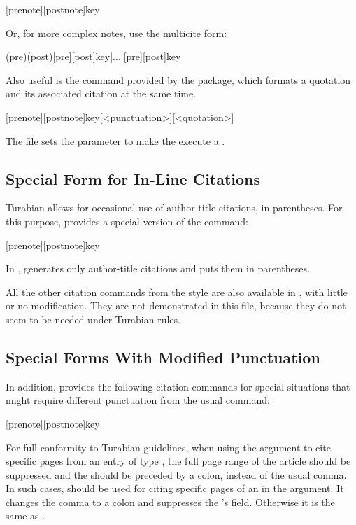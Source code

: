 \documentclass{ltxdockit}[2010/02/12]
\begin{document}
\begin{ltxsyntax}

[prenote][postnote]{key}

Or, for more complex notes, use the multicite form: 

(pre)(post)[pre][post]{key}|...|[pre][post]{key}


Also useful is the   command provided by the  package, which formats a quotation and its associated citation at the same time. 

[prenote][postnote]{key}[<punctuation>][<quotation>]

The  file sets the  parameter to make the  execute a .

\subsection{Special Form for In-Line Citations}

Turabian allows for occasional use of author-title citations, in parentheses. For this purpose,  provides a special version of the  command:

[prenote][postnote]{key}

In ,  generates only author-title citations and puts them in parentheses.

All the other citation commands from the  style are also available in , with little or no modification. They are not demonstrated in this file, because they do not seem to be needed under Turabian rules.

\subsection{Special Forms With Modified Punctuation}

In addition,  provides the following citation commands for special situations that might require different punctuation from the usual  command:

[prenote][postnote]{key}
 
For full conformity to Turabian guidelines, when using the  argument to cite specific pages from an entry of type , the full page range of the article should be suppressed and the  should be preceded by a colon, instead of the usual comma.  In such cases,  should be used for citing specific pages of an  in the  argument. It changes the comma to a colon and suppresses the 's  field. Otherwise it is the same as .


\end{ltxsyntax}
\end{document}
